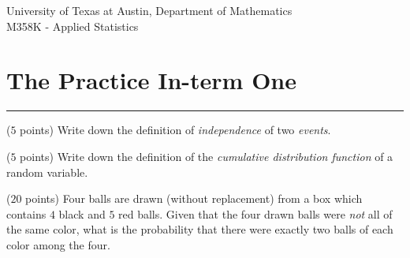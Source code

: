 \documentclass[reqno,letterpaper, onsided,10pt]{amsart}
\theoremstyle{definition}
\newcommand{\sol}[1]{\par\noindent{\bf Solution:} #1}
\renewcommand{\sol}[1]{}
\begin{document}
\thispagestyle{fancy}

\begin{center}
{{\sc University of Texas at Austin, Department of Mathematics}}\\
M358K - Applied Statistics
\end{center}


\setcounter{section}{1}
\section*{The Practice In-term One}

\bigskip
\hrule
\bigskip

\begin{problem} ($5$ points) Write down the definition of {\em independence}
  of two {\em events}.
\end{problem}

\sol{
Two events $A$ and $B$ are said to be {\em independent} if 
\begin{equation}%
    \nonumber 
    \begin{split}
      \PP[A \cap B] = \PP[A] \cdot \PP[B]
    \end{split}
\end{equation}
}

\medskip

\begin{problem} ($5$ points) Write down the definition of the {\em cumulative
    distribution function} of a random variable.  
\end{problem}

  \sol{ 
  Let $X$ be a random variable. Its {\em cumulative distribution
      function} is a function $F_X : \R \to [0,1]$ defined by
\begin{equation}%
    \nonumber 
    \begin{split}
      F_X(x) = \PP[X \le x], \quad \text{for every $x\in\R$}. 
    \end{split}
\end{equation} 
}

\medskip

\begin{problem} ($20$ points) %
Four balls are drawn (without replacement) from a box which contains
$4$ black and $5$ red
balls. Given that the four drawn balls were {\em not} all of
the same color, what is the probability that there were exactly two
balls of each color among the four. 
\end{problem}
\end{document}

